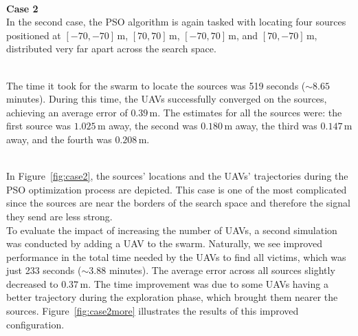 \documentclass[main]{subfiles}
\begin{document}
\noindent\\
\textbf{Case 2}\\
In the second case, the PSO algorithm is again tasked with locating four 
sources positioned at \([-70, -70] \, \text{m}\), \([70, 70] \, \text{m}\), \([-70, 70] \, \text{m}\), and \([70, -70] \, \text{m}\), 
distributed very far apart across the search space.

\noindent\\
The time it took for the swarm to locate the sources was 519 seconds (\(\sim 8.65\) minutes). 
During this time, 
the UAVs successfully converged on the sources, achieving an average error of \(0.39 \, \text{m}\). 
The estimates for all the sources were: the first source was \(1.025 \, \text{m}\) away, 
the second was \(0.180 \, \text{m}\) away, the third was \(0.147 \, \text{m}\) away, 
and the fourth was \(0.208 \, \text{m}\). 

\noindent\\
In Figure~\ref{fig:case2}, the sources' locations and the UAVs' 
trajectories during the PSO optimization process are depicted. 
This case is one of the most complicated since the sources are near
the borders of the search space and therefore
the signal they send are less strong.
\noindent\\
To evaluate the impact of increasing the number of UAVs, a second simulation 
was conducted by adding a UAV to the swarm. 
Naturally, we see improved performance in the total time
needed by the UAVs to find all victims, which was just 233 seconds (\(\sim 3.88\) minutes).
The average error across all sources slightly decreased to \(0.37 \, \text{m}\). 
The time improvement was due to some UAVs 
having a better trajectory during the exploration phase, which brought 
them nearer the sources.
Figure~\ref{fig:case2more} illustrates the results of this improved configuration. 
\end{document}

